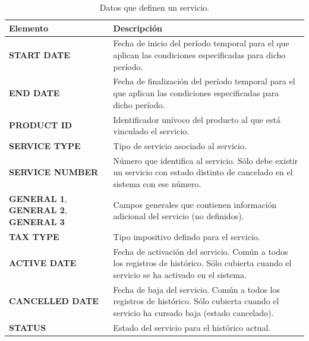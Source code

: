 \begin{table}
  \centering
  \setlength{\leftmargini}{0.4cm}
  \resizebox{14cm}{!} {
  \begin{tabular}{|m{4.5cm} m{11cm}|}
  \rowcolor{udcpink!25}
  \hline
  	\textbf{Elemento} & \textbf{Descripción} \\\hline
  	\textbf{START DATE} & Fecha de inicio del período temporal para el que aplican las condiciones especificadas para dicho período.\\
  	\textbf{END DATE} & Fecha de finalización del período temporal para el que aplican las condiciones especificadas para dicho período.\\
	\textbf{PRODUCT ID} & Identificador unívoco del producto al que está vinculado el servicio.\\
	\textbf{SERVICE TYPE} & Tipo de servicio asociado al servicio.\\
	\textbf{SERVICE NUMBER} & Número que identifica al servicio. Sólo debe existir un servicio con estado distinto de cancelado en el sistema con ese número.\\
	\textbf{GENERAL 1}, \textbf{GENERAL 2}, \textbf{GENERAL 3} & Campos generales que contienen información adicional del servicio (no definidos).\\	
	\textbf{TAX TYPE} & Tipo impositivo defindo para el servicio.\\
	\textbf{ACTIVE DATE} & Fecha de activación del servicio. Común a todos los registros de histórico. Sólo cubierta cuando el servicio se ha activado en el sistema.\\	
	\textbf{CANCELLED DATE} & Fecha de baja del servicio. Común a todos los registros de histórico. Sólo cubierta cuando el servicio ha cursado baja (estado cancelado).	\\
	\textbf{STATUS} & Estado del servicio para el histórico actual.	
	\\\hline
  \end{tabular}
  } %
  \caption{Datos que definen un servicio.}
  \label{tab:servicio}
\end{table}

